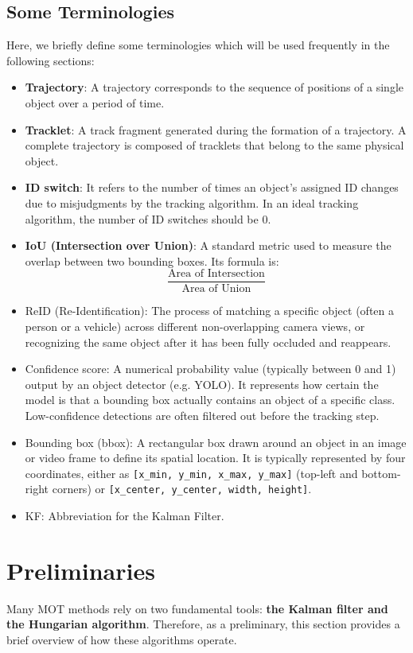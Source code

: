 \documentclass[10pt,twocolumn,letterpaper]{article}
\begin{document}
\subsection{Some Terminologies}
Here, we briefly define some terminologies which will be used frequently in the following sections:
\begin{itemize}
    \item \textbf{Trajectory}: A trajectory corresponds to the sequence of positions of a single object over a period of time.
    \item \textbf{Tracklet}: A track fragment generated during the formation of a trajectory. A complete trajectory is composed of tracklets that belong to the same physical object. 
    \item \textbf{ID switch}: It refers to the number of times an object's assigned ID changes due to misjudgments by the tracking algorithm. In an ideal tracking algorithm, the number of ID switches should be 0.
    \item \textbf{IoU (Intersection over Union)}: A standard metric used to measure the overlap between two bounding boxes. Its formula is:
    $$\frac{\text{Area of Intersection}}{\text{Area of Union}}$$
    \item ReID (Re-Identification): The process of matching a specific object (often a person or a vehicle) across different non-overlapping camera views, or recognizing the same object after it has been fully occluded and reappears. 
    \item Confidence score: A numerical probability value (typically between 0 and 1) output by an object detector (e.g. YOLO). It represents how certain the model is that a bounding box actually contains an object of a specific class. Low-confidence detections are often filtered out before the tracking step.
    \item Bounding box (bbox): A rectangular box drawn around an object in an image or video frame to define its spatial location. It is typically represented by four coordinates, either as \texttt{[x\_min, y\_min, x\_max, y\_max]} (top-left and bottom-right corners) or \texttt{[x\_center, y\_center, width, height]}.
    \item KF: Abbreviation for the Kalman Filter.
\end{itemize}
\section{Preliminaries}
Many MOT methods rely on two fundamental tools: \textbf{the Kalman filter and the Hungarian algorithm}. Therefore, as a preliminary, this section provides a brief overview of how these algorithms operate.
\end{document}
